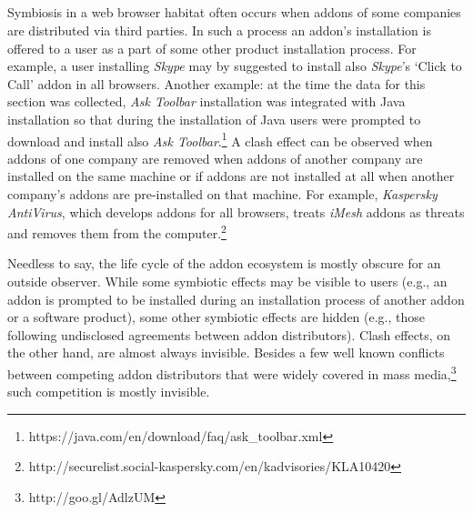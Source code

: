\documentclass{article} %
\begin{document}
\noindent 
\subsection{}

 Symbiosis in a web browser habitat often occurs when addons of some companies are distributed via third parties. In such a process an addon's installation is offered to a user as a part of some other product installation process. For example, a user installing \textit{Skype} may by suggested to install also \textit{Skype}'s `Click to Call' addon in all browsers. Another example: at the time the data for this section was collected, \textit{Ask Toolbar} installation was integrated with Java installation so that during the installation of Java users were prompted to download and install also \textit{Ask Toolbar}.\footnote{ https://java.com/en/download/faq/ask\_toolbar.xml} A clash effect can be observed when addons of one company are removed when addons of another company are installed on the same machine or if addons are not installed at all when another company's addons are pre-installed on that machine. For example, \textit{Kaspersky AntiVirus}, which develops addons for all browsers, treats \textit{iMesh} addons as threats and removes them from the computer.\footnote{ http://securelist.social-kaspersky.com/en/kadvisories/KLA10420} 

Needless to say, the life cycle of the addon ecosystem is mostly obscure for an outside observer. While some symbiotic effects may be visible to users (e.g., an addon is prompted to be installed during an installation process of another addon or a software product), some other symbiotic effects are hidden (e.g., those following undisclosed agreements between addon distributors). Clash effects, on the other hand, are almost always invisible. Besides a few well known conflicts between competing addon distributors that were widely covered in mass media,\footnote{ http://goo.gl/AdlzUM} such competition is mostly invisible. 
\end{document}

